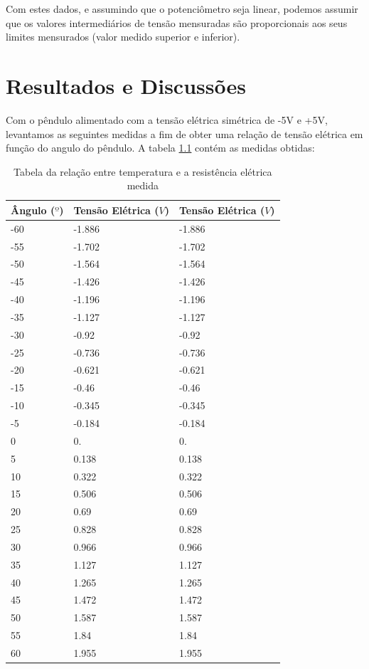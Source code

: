 \documentclass[12pt,a4paper]{instrumentacao}
\begin{document}
Com estes dados, e assumindo que o potenciômetro seja linear, podemos assumir que os valores intermediários de tensão mensuradas são proporcionais aos seus limites mensurados (valor medido superior e inferior).

\chapter{Resultados e Discussões}

Com o pêndulo alimentado com a tensão elétrica simétrica de -5V e +5V, levantamos as seguintes medidas a fim de obter uma relação de tensão elétrica em função do angulo do pêndulo. A tabela \ref{tab:pendulo-calibracao} contém as medidas obtidas:

\begin{table}[H]
\centering
\caption{Tabela da relação entre temperatura e a resistência elétrica medida}
\begin{tabular}{|l|l|l|}
 \hline
 \textbf{Ângulo ($º$)} & \textbf{Tensão Elétrica ($V$)} & \textbf{Tensão Elétrica ($V$)} \\ \hline

 -60 & -1.886 & -1.886 	\\ \hline
 -55 & -1.702 & -1.702 	\\ \hline
 -50 & -1.564 & -1.564 	\\ \hline
 -45 & -1.426 & -1.426 	\\ \hline
 -40 & -1.196 & -1.196 	\\ \hline
 -35 & -1.127 & -1.127 	\\ \hline
 -30 & -0.92 & -0.92 	\\ \hline
 -25 & -0.736 & -0.736 	\\ \hline
 -20 & -0.621 & -0.621 	\\ \hline
 -15 & -0.46 & -0.46 	\\ \hline
 -10 & -0.345 & -0.345 	\\ \hline
 -5 & -0.184 & -0.184 	\\ \hline
 0 & 0. & 0. 			\\ \hline
 5 & 0.138 & 0.138 		\\ \hline
 10 & 0.322 & 0.322 	\\ \hline
 15 & 0.506 & 0.506 	\\ \hline
 20 & 0.69 & 0.69 		\\ \hline
 25 & 0.828 & 0.828 	\\ \hline
 30 & 0.966 & 0.966 	\\ \hline
 35 & 1.127 & 1.127 	\\ \hline
 40 & 1.265 & 1.265 	\\ \hline
 45 & 1.472 & 1.472 	\\ \hline
 50 & 1.587 & 1.587 	\\ \hline
 55 & 1.84 & 1.84 		\\ \hline
 60 & 1.955 & 1.955 	\\ \hline
 
\end{tabular}
\label{tab:pendulo-calibracao}
\end{table}
\end{document}
